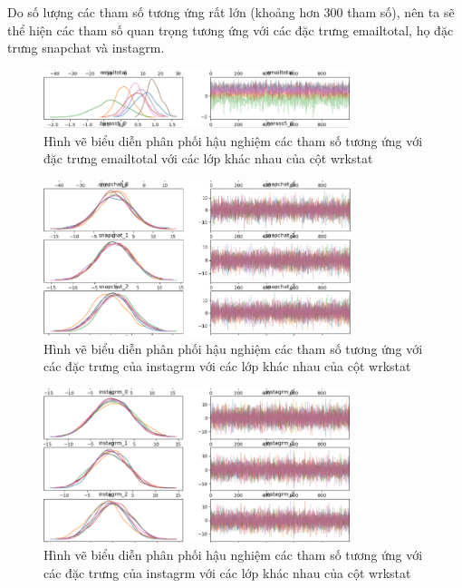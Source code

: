 Do số lượng các tham số tương ứng rất lớn (khoảng hơn 300 tham số), nên ta sẽ thể hiện các tham số quan trọng tương ứng với các đặc trưng emailtotal, họ đặc trưng snapchat và instagrm.

\begin{figure}[H]
    \centering
    \includegraphics[width=0.8\textwidth]{figures/Thanh/Models/Bayesian_Multi_Logit/Bayesian_email_non_null_emailtotal_weights_plot.png}
    \caption{Hình vẽ biểu diễn phân phối hậu nghiệm các tham số tương ứng với đặc trưng emailtotal với các lớp khác nhau của cột wrkstat}
    \label{fig:Bayesian_email_non_null_emailtotal_weights_plot}
\end{figure}


\begin{figure}[H]
    \centering
    \includegraphics[width=0.8\textwidth]{figures/Thanh/Models/Bayesian_Multi_Logit/Bayesian_email_non_null_snapchat_weights_plot.png}
    \caption{Hình vẽ biểu diễn phân phối hậu nghiệm các tham số tương ứng với các đặc trưng của instagrm với các lớp khác nhau của cột wrkstat}
    \label{fig:Bayesian_email_non_null_snapchat_weights_plot}
\end{figure}

\begin{figure}[H]
    \centering
    \includegraphics[width=0.8\textwidth]{figures/Thanh/Models/Bayesian_Multi_Logit/Bayesian_email_non_null_instagrm_weights_plot.png}
    \caption{Hình vẽ biểu diễn phân phối hậu nghiệm các tham số tương ứng với các đặc trưng của instagrm với các lớp khác nhau của cột wrkstat}
    \label{fig:Bayesian_email_non_null_instagrm_weights_plot}
\end{figure}


